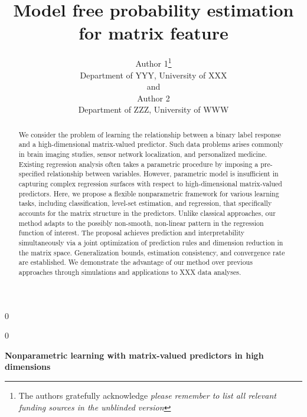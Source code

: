 \documentclass[12pt]{article}
\newcommand{\blind}{0}
\begin{document}
\setcounter{secnumdepth}{3}
%

\def\spacingset#1{\renewcommand{\baselinestretch}%
{#1}\small\normalsize} \spacingset{1}



\blind
{
  \title{\bf Model free probability estimation for matrix feature}
  \author{Author 1\thanks{
    The authors gratefully acknowledge \textit{please remember to list all relevant funding sources in the unblinded version}}\hspace{.2cm}\\
    Department of YYY, University of XXX\\
    and \\
    Author 2 \\
    Department of ZZZ, University of WWW}
  \maketitle
} \fi

\blind
{
  \bigskip
  \bigskip
  \bigskip
  \begin{center}
    {\LARGE\bf Nonparametric learning with matrix-valued predictors in high dimensions}
\end{center}
  \medskip
} \fi

\bigskip
\begin{abstract}
We consider the problem of learning the relationship between a binary label response and a high-dimensional matrix-valued predictor. Such data problems arises commonly in brain imaging studies, sensor network localization, and personalized medicine. Existing regression analysis often takes a parametric procedure by imposing a pre-specified relationship between variables. However, parametric model is insufficient in capturing complex regression surfaces with respect to high-dimensional matrix-valued predictors. Here, we propose a flexible nonparametric framework for various learning tasks, including classification, level-set estimation, and regression, that specifically accounts for the matrix structure in the predictors. Unlike classical approaches, our method adapts to the possibly non-smooth, non-linear pattern in the regression function of interest. The proposal achieves prediction and interpretability simultaneously via a joint optimization of prediction rules and dimension reduction in the matrix space. Generalization bounds, estimation consistency, and convergence rate are established. We demonstrate the advantage of our method over previous approaches through simulations and applications to  {\color{red}XXX} data analyses. 
\end{abstract}
\end{document}
